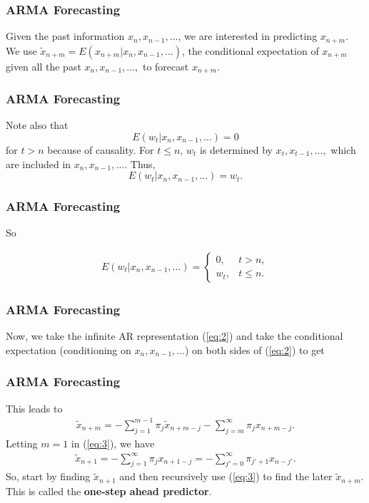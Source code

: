 \documentclass[%
xcolor=pdftex]{beamer}
\begin{document}
\begin{frame}
\frametitle{ARMA Forecasting}

Given the past information $x_{n},x_{n-1},\ldots$, we are
interested in predicting $x_{n+m}$. We use $\widetilde{x}_{n+m}=E(x_{n+m}|x_n,x_{n-1},...) $,
the conditional expectation of $x_{n+m}$ given all the past
$x_n,x_{n-1},\ldots,$ to forecast $x_{n+m}$.

\end{frame}

\begin{frame}
\frametitle{ARMA Forecasting}

Note also that
$$
E(w_t|x_n,x_{n-1},...)=0
$$
for $t>n$  because of causality. For $t \leq n$, $w_t$ is
determined by $x_t,x_{t-1},\ldots,$ which are included in
$x_n,x_{n-1},\ldots$. Thus,
$$
E(w_t|x_n,x_{n-1},...)=w_t.
$$

\end{frame}

\begin{frame}
\frametitle{ARMA Forecasting}

So

\begin{eqnarray}\label{eq:causal_white}
E(w_t|x_n,x_{n-1},...) = \left \{ \begin{array}{ll}
0, & t > n, \\
w_t, & t \leq n.
\end{array} \right.
\end{eqnarray}

\end{frame}


\begin{frame}
\frametitle{ARMA Forecasting}

Now, we take the infinite AR representation (\ref{eq:2}) and
take the conditional expectation (conditioning on $x_n,
x_{n-1},...$) on both sides of (\ref{eq:2}) to get

\vspace{40mm}

\end{frame}

\begin{frame}
\frametitle{ARMA Forecasting}

This leads to
\begin{eqnarray}\label{eq:3}
\widetilde{x}_{n+m} =- \sum_{j=1}^{m-1} \pi_j \widetilde{x}_{n+m-j}-\sum_{j=m}^\infty \pi_j x_{n+m-j}.
\end{eqnarray}
Letting $m=1$ in (\ref{eq:3}), we have
\begin{eqnarray*}
\widetilde{x}_{n+1} = -\sum^\infty_{j=1} \pi_j x_{n+1-j} = - \sum^\infty_{j'=0} \pi_{j'+1} x_{n-j'}.
\end{eqnarray*}
So, start by finding $\widetilde{x}_{n+1}$ and then recursively use
(\ref{eq:3}) to find the later $\widetilde{x}_{n+m}$. This is called the \textbf{one-step ahead predictor}.

\end{frame}
\end{document}
